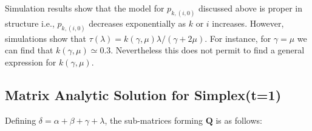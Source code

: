 \documentclass[sigconf,draft]{acmart}
\begin{document}
Simulation results show that the model for $p_{k,(i,0)}$ discussed above is proper in structure i.e., $p_{k,(i,0)}$ decreases exponentially as $k$ or $i$ increases. However, simulations show that $\tau(\lambda) = k(\gamma,\mu)\lambda/(\gamma+2\mu)$. For instance, for $\gamma=\mu$ we can find that $k(\gamma,\mu) \simeq 0.3$. Nevertheless this does not permit to find a general expression for $k(\gamma,\mu)$.

\subsection{Matrix Analytic Solution for Simplex(t=1)}
\label{subsec:subsec_simplex_t_1_matrix_analytic}
Defining $\delta = \alpha+\beta+\gamma+\lambda$, the sub-matrices forming $\bm{Q}$ is as follows:
\end{document}

